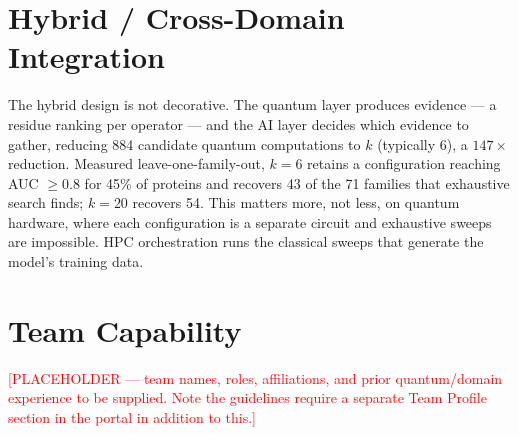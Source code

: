 \documentclass[10pt,a4paper]{article}
\begin{document}
\section{Hybrid / Cross-Domain Integration}

The hybrid design is not decorative. The quantum layer produces evidence --- a residue ranking per
operator --- and the AI layer decides which evidence to gather, reducing 884 candidate quantum
computations to $k$ (typically 6), a $147\times$ reduction. Measured leave-one-family-out, $k{=}6$
retains a configuration reaching AUC $\ge0.8$ for 45\% of proteins and recovers 43 of the 71
families that exhaustive search finds; $k{=}20$ recovers 54. This matters more, not less, on
quantum hardware, where each configuration is a separate circuit and exhaustive sweeps are
impossible. HPC orchestration runs the classical sweeps that generate the model's training data.

\section{Team Capability}

\textcolor{red}{[PLACEHOLDER --- team names, roles, affiliations, and prior quantum/domain
experience to be supplied. Note the guidelines require a separate Team Profile section in the
portal in addition to this.]}
\end{document}
